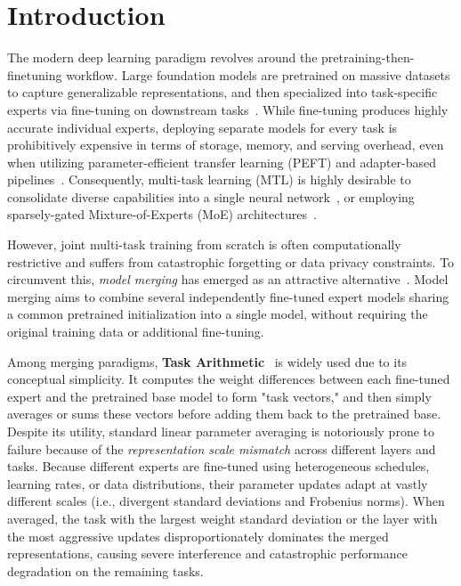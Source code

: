 \section{Introduction}
\label{submission:sec:intro}

The modern deep learning paradigm revolves around the pretraining-then-finetuning workflow. Large foundation models are pretrained on massive datasets to capture generalizable representations, and then specialized into task-specific experts via fine-tuning on downstream tasks~\cite{radford2021learning, devlin2018bert}. While fine-tuning produces highly accurate individual experts, deploying separate models for every task is prohibitively expensive in terms of storage, memory, and serving overhead, even when utilizing parameter-efficient transfer learning (PEFT) and adapter-based pipelines~\cite{hu21lora, dettmers2024qlora, houlsby2019parameter}. Consequently, multi-task learning (MTL) is highly desirable to consolidate diverse capabilities into a single neural network~\cite{caruana1997multitask, ruder2017overview}, or employing sparsely-gated Mixture-of-Experts (MoE) architectures~\cite{fedus2022switch, shazeer2017outrageously, jacobs1991adaptive}. 

However, joint multi-task training from scratch is often computationally restrictive and suffers from catastrophic forgetting or data privacy constraints. To circumvent this, \textit{model merging} has emerged as an attractive alternative~\cite{wortsman2022model, mcmahan2017communication, matena2022merging, ainsworth2023git, stoica2023zipit}. Model merging aims to combine several independently fine-tuned expert models sharing a common pretrained initialization into a single model, without requiring the original training data or additional fine-tuning.

Among merging paradigms, \textbf{Task Arithmetic}~\cite{ilharco2022editing} is widely used due to its conceptual simplicity. It computes the weight differences between each fine-tuned expert and the pretrained base model to form "task vectors," and then simply averages or sums these vectors before adding them back to the pretrained base. Despite its utility, standard linear parameter averaging is notoriously prone to failure because of the \textit{representation scale mismatch} across different layers and tasks. Because different experts are fine-tuned using heterogeneous schedules, learning rates, or data distributions, their parameter updates adapt at vastly different scales (i.e., divergent standard deviations and Frobenius norms). When averaged, the task with the largest weight standard deviation or the layer with the most aggressive updates disproportionately dominates the merged representations, causing severe interference and catastrophic performance degradation on the remaining tasks.

